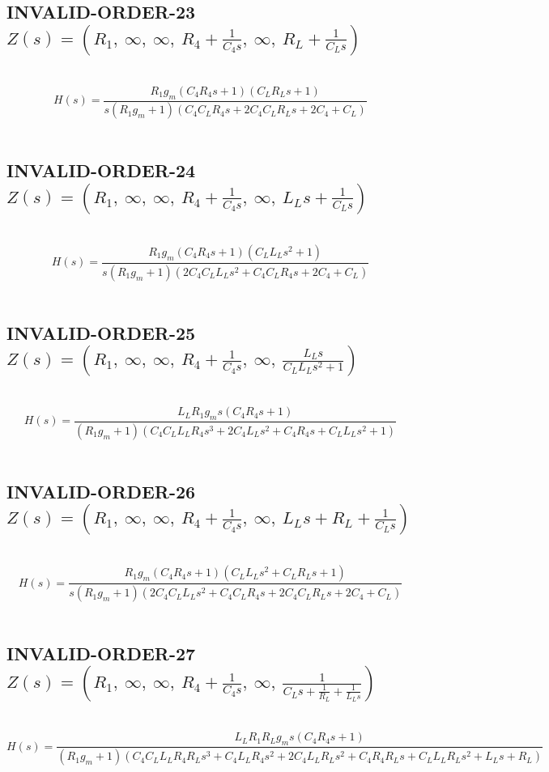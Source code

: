 \documentclass{article}
\begin{document}
\subsection{INVALID-ORDER-23 $Z(s) = \left( R_{1}, \  \infty, \  \infty, \  R_{4} + \frac{1}{C_{4} s}, \  \infty, \  R_{L} + \frac{1}{C_{L} s}\right)$ } \ 
\textbf{\[H(s) = \frac{R_{1} g_{m} \left(C_{4} R_{4} s + 1\right) \left(C_{L} R_{L} s + 1\right)}{s \left(R_{1} g_{m} + 1\right) \left(C_{4} C_{L} R_{4} s + 2 C_{4} C_{L} R_{L} s + 2 C_{4} + C_{L}\right)}\] } \ 
\subsection{INVALID-ORDER-24 $Z(s) = \left( R_{1}, \  \infty, \  \infty, \  R_{4} + \frac{1}{C_{4} s}, \  \infty, \  L_{L} s + \frac{1}{C_{L} s}\right)$ } \ 
\textbf{\[H(s) = \frac{R_{1} g_{m} \left(C_{4} R_{4} s + 1\right) \left(C_{L} L_{L} s^{2} + 1\right)}{s \left(R_{1} g_{m} + 1\right) \left(2 C_{4} C_{L} L_{L} s^{2} + C_{4} C_{L} R_{4} s + 2 C_{4} + C_{L}\right)}\] } \ 
\subsection{INVALID-ORDER-25 $Z(s) = \left( R_{1}, \  \infty, \  \infty, \  R_{4} + \frac{1}{C_{4} s}, \  \infty, \  \frac{L_{L} s}{C_{L} L_{L} s^{2} + 1}\right)$ } \ 
\textbf{\[H(s) = \frac{L_{L} R_{1} g_{m} s \left(C_{4} R_{4} s + 1\right)}{\left(R_{1} g_{m} + 1\right) \left(C_{4} C_{L} L_{L} R_{4} s^{3} + 2 C_{4} L_{L} s^{2} + C_{4} R_{4} s + C_{L} L_{L} s^{2} + 1\right)}\] } \ 
\subsection{INVALID-ORDER-26 $Z(s) = \left( R_{1}, \  \infty, \  \infty, \  R_{4} + \frac{1}{C_{4} s}, \  \infty, \  L_{L} s + R_{L} + \frac{1}{C_{L} s}\right)$ } \ 
\textbf{\[H(s) = \frac{R_{1} g_{m} \left(C_{4} R_{4} s + 1\right) \left(C_{L} L_{L} s^{2} + C_{L} R_{L} s + 1\right)}{s \left(R_{1} g_{m} + 1\right) \left(2 C_{4} C_{L} L_{L} s^{2} + C_{4} C_{L} R_{4} s + 2 C_{4} C_{L} R_{L} s + 2 C_{4} + C_{L}\right)}\] } \ 
\subsection{INVALID-ORDER-27 $Z(s) = \left( R_{1}, \  \infty, \  \infty, \  R_{4} + \frac{1}{C_{4} s}, \  \infty, \  \frac{1}{C_{L} s + \frac{1}{R_{L}} + \frac{1}{L_{L} s}}\right)$ } \ 
\textbf{\[H(s) = \frac{L_{L} R_{1} R_{L} g_{m} s \left(C_{4} R_{4} s + 1\right)}{\left(R_{1} g_{m} + 1\right) \left(C_{4} C_{L} L_{L} R_{4} R_{L} s^{3} + C_{4} L_{L} R_{4} s^{2} + 2 C_{4} L_{L} R_{L} s^{2} + C_{4} R_{4} R_{L} s + C_{L} L_{L} R_{L} s^{2} + L_{L} s + R_{L}\right)}\] } \ 
\end{document}
